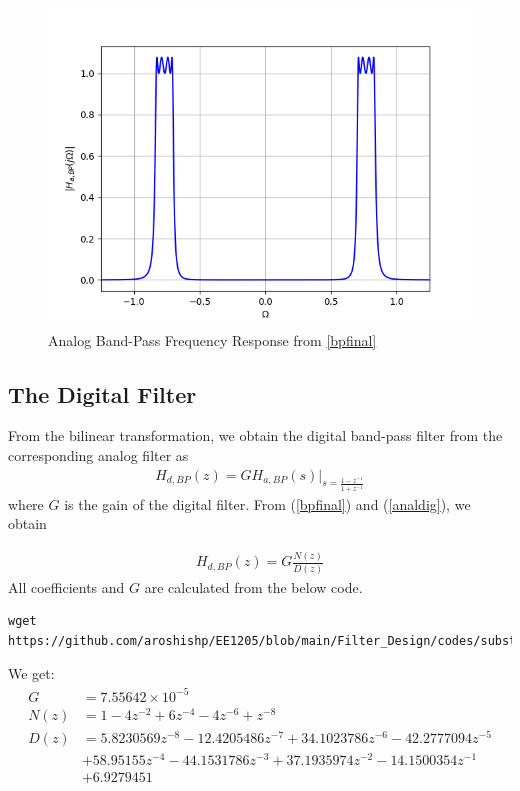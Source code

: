 \documentclass{article}
\begin{document}
\begin{figure}[!h]
    \centering
    \includegraphics[width= \columnwidth]{figs/Hbp.png}
    \caption{Analog Band-Pass Frequency Response from \eqref{bpfinal}}
    \label{fig:4}
\end{figure}



\subsection{The Digital Filter}
From the bilinear transformation, we obtain the digital band-pass filter from the corresponding analog filter as
\begin{eqnarray}
\label{analdig}
H_{d,BP}(z) = GH_{a,BP}(s)\vert_{s = \frac{1-z^{-1}}{1 + z^{-1}}}
\end{eqnarray}
where $G$ is the gain of the digital filter.  From (\ref{bpfinal}) and (\ref{analdig}), we obtain

\begin{eqnarray}
H_{d,BP}(z) = G \frac{N(z)}{D(z)}
\end{eqnarray}
All coefficients and $G$ are calculated from the below code.
\begin{lstlisting}[caption = {Code for G, N(z), D(z)}]
wget https://github.com/aroshishp/EE1205/blob/main/Filter_Design/codes/substitutor.py
\end{lstlisting}

We get:
\begin{align}
    G &= 7.55642 \times 10^{-5}\\
    N(z) &=  1 - 4 z^{-2} + 6 z^{-4} - 4z^{-6} + z^{-8}\\
    D(z) &= 5.8230569z^{-8} - 12.4205486z^{-7} + 34.1023786z^{-6} - 42.2777094z^{-5}\nonumber \\
  &+ 58.95155z^{-4} - 44.1531786z^{-3} + 37.1935974z^{-2} - 14.1500354z^{-1}\nonumber\\
  &+ 6.9279451
\end{align}
\end{document}
